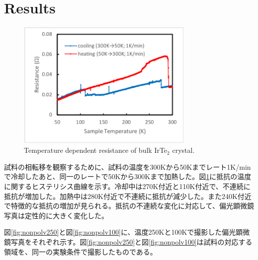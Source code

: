 \documentclass[11pt,a4paper]{article}
\begin{document}
\section{Results}
\begin{figure}
  \begin{center}
  \vspace{-3zh}
   \hspace{-5mm}
   \includegraphics[width=85mm]{resistance50-300.eps}
  \end{center}
  \caption{Temperature dependent resistance of bulk IrTe$_2$ crystal.}
  \label{fig:resistance50-300}
\end{figure}

試料の相転移を観察するために、試料の温度を300Kから50Kまでレート1K/minで冷却したあと、同一のレートで50Kから300Kまで加熱した。図\ref{fig:resistance50-300}に抵抗の温度に関するヒステリシス曲線を示す。冷却中は270K付近と110K付近で、不連続に抵抗が増加した。加熱中は280K付近で不連続に抵抗が減少した。また240K付近で特徴的な抵抗の増加が見られる。抵抗の不連続な変化に対応して、偏光顕微鏡写真は定性的に大きく変化した。

図\ref{fig:nonpolv250}と図\ref{fig:nonpolv100}に、温度250Kと100Kで撮影した偏光顕微鏡写真をそれぞれ示す。図\ref{fig:nonpolv250}と図\ref{fig:nonpolv100}は試料の対応する領域を、同一の実験条件で撮影したものである。
\end{document}
